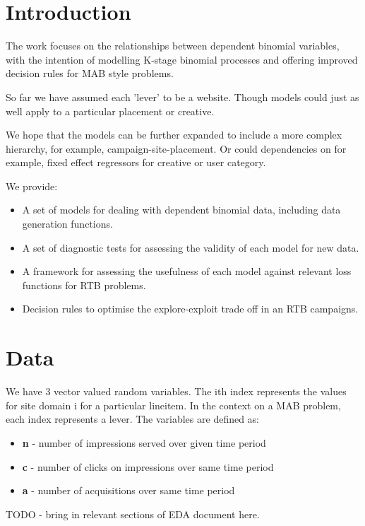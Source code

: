\documentclass[12pt]{article}
\date{}
\begin{document}
\tableofcontents
\pagebreak

\section{Introduction}

The work focuses on the relationships between dependent binomial variables, with the intention of modelling K-stage binomial processes and offering improved decision rules for MAB style problems.

So far we have assumed each 'lever' to be a website. Though models could just as well apply to a particular placement or creative.

We hope that the models can be further expanded to include a more complex hierarchy, for example, campaign-site-placement. Or could dependencies on for example, fixed effect regressors for creative or user category.

We provide:
\begin{itemize}
	\item A set of models for dealing with dependent binomial data, including data generation functions.
	\item A set of diagnostic tests for assessing the validity of each model for new data.
	\item A framework for assessing the usefulness of each model against relevant loss functions for RTB problems.
	\item Decision rules to optimise the explore-exploit trade off in an RTB campaigns.
\end{itemize}


\section{Data}

We have 3 vector valued random variables. The ith index represents the values for site domain i for a particular lineitem. In the context on a MAB problem, each index represents a lever. The variables are defined as:
\begin{itemize}
	\item \textbf{n} - number of impressions served over given time period
	\item \textbf{c} - number of clicks on impressions over same time period 
	\item \textbf{a} - number of acquisitions over same time period
\end{itemize}

TODO - bring in relevant sections of EDA document here.
\end{document}
